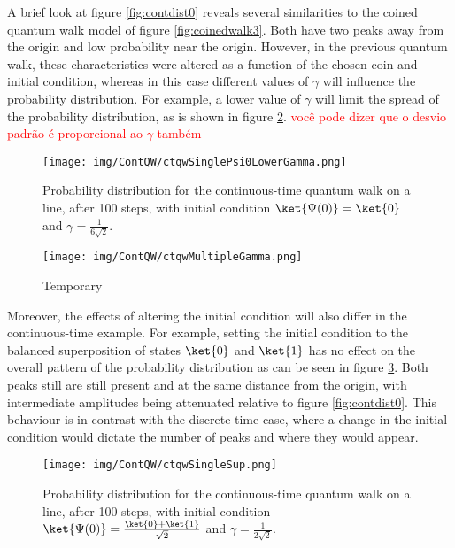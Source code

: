             A brief look at figure \ref{fig:contdist0} reveals several similarities to the coined quantum walk model of figure \ref{fig:coinedwalk3}. Both have two peaks away from the origin and low probability near the origin.
             However, in the previous quantum walk, these characteristics were altered as a function of the chosen coin and initial condition, whereas in this case different values of $\gamma$ will influence the probability distribution. For example, a lower value of $\gamma$ will limit the spread of the probability distribution, as is shown in figure \ref{fig:contdist1}. \textcolor{red}{você pode dizer que o desvio padrão é proporcional ao $\gamma$ também}
                \begin{figure}[!h]
                    \centering
                    \texttt{[image: img/ContQW/ctqwSinglePsi0LowerGamma.png]}
                    \caption{Probability distribution for the continuous-time quantum walk on a line, after 100 steps, with initial condition $\ket{\Psi(0)}=\ket{0}$ and $\gamma=\frac{1}{6\sqrt{2}}$.} 
                    \label{fig:contdist1}
                \end{figure}
                
                \begin{figure}[!h]
                    \centering
                    \texttt{[image: img/ContQW/ctqwMultipleGamma.png]}
                    \caption{Temporary} 
                    \label{fig:contdist1}
                \end{figure}
                
            Moreover, the effects of altering the initial condition will also differ in the continuous-time example. For example, setting the initial condition to the balanced superposition of states $\ket{0}$ and $\ket{1}$ has no effect on the overall pattern of the probability distribution as can be seen in figure \ref{fig:contdist2}. Both peaks still are still present and at the same distance from the origin, with intermediate amplitudes being attenuated relative to figure \ref{fig:contdist0}. This behaviour is in contrast with the discrete-time case, where a change in the initial condition would dictate the number of peaks and where they would appear.
            
                \begin{figure}[!h]
                    \centering
                    \texttt{[image: img/ContQW/ctqwSingleSup.png]}
                    \caption{Probability distribution for the continuous-time quantum walk on a line, after 100 steps, with initial condition $\ket{\Psi(0)}=\frac{\ket{0}+\ket{1}}{\sqrt{2}}$ and $\gamma=\frac{1}{2\sqrt{2}}$.} 
                    \label{fig:contdist2}
                \end{figure}
                
